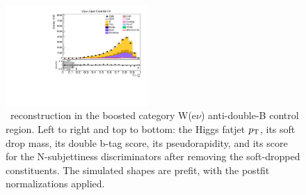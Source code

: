 \begin{figure}[tbp]
\begin{center}
    \includegraphics[width=0.48\textwidth]{figures/wlnhbb2016/boosted/WenWHTT1bFJCR_fj1Tau32SD.pdf}
    \caption{\HBB\ reconstruction in the boosted category W(e$\nu$) anti-double-B control region.
    Left to right and top to bottom: the Higgs fatjet $p_{\mathrm{T}}$, its soft drop mass, its
    double b-tag score, its pseudorapidity, and its score for the N-subjettiness discriminators
    after removing the soft-dropped constituents.
    The simulated shapes are prefit, with the postfit normalizations applied.}
    \label{fig:boost_WenTT1b_Hbb}
  \end{center}
\end{figure}
\clearpage

